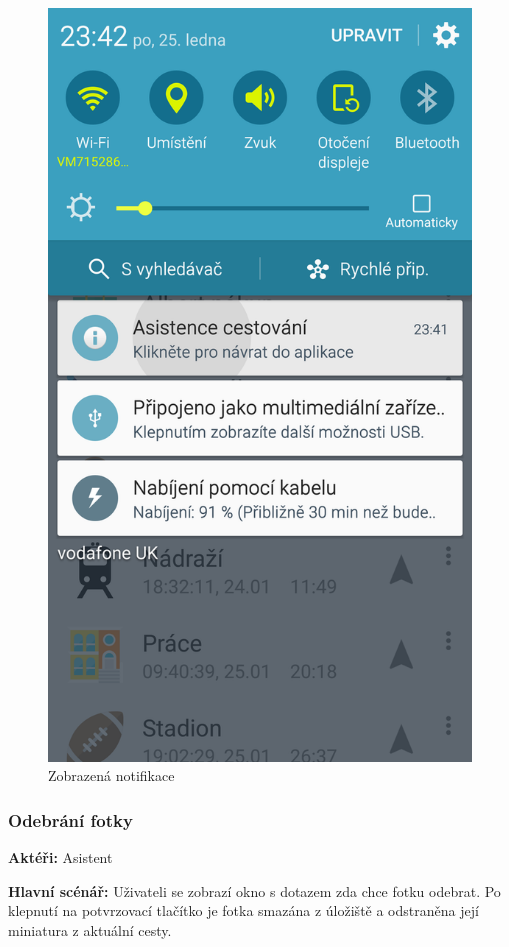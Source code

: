 \documentclass[czech,master,public,dept460,male,java,cpdeclaration]{diploma}
\newcommand{\usecase}[2]{\subsubsection{#1}\label{#2}}
\begin{document}
\begin{figure}[H]
\begin{minipage}{.5\textwidth}
                \includegraphics[scale=0.14]{img/screen/notifikace.png}
        \caption{Zobrazená notifikace}
        \label{fig:notifikacenahravanicesty}

       \end{minipage}
\end{figure}


\usecase{Odebrání fotky}{odebranifotky}
\textbf{Aktéři:} Asistent

\vspace{0.1cm}
\noindent
\textbf{Hlavní scénář:} Uživateli se zobrazí okno s dotazem zda chce fotku odebrat. Po klepnutí na
potvrzovací tlačítko je fotka smazána z úložiště a odstraněna její miniatura z aktuální cesty.
\end{document}
